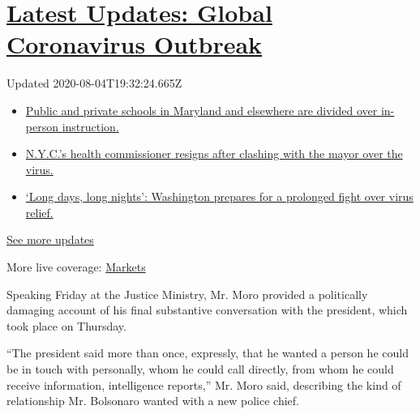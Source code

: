 \hypertarget{latest-updates-global-coronavirus-outbreak}{%
\section{\texorpdfstring{\href{https://www.nytimes3xbfgragh.onion/2020/08/04/world/coronavirus-cases.html?action=click\&pgtype=Article\&state=default\&region=MAIN_CONTENT_1\&context=storylines_live_updates}{Latest
Updates: Global Coronavirus
Outbreak}}{Latest Updates: Global Coronavirus Outbreak}}\label{latest-updates-global-coronavirus-outbreak}}

Updated 2020-08-04T19:32:24.665Z

\begin{itemize}
\tightlist
\item
  \href{https://www.nytimes3xbfgragh.onion/2020/08/04/world/coronavirus-cases.html?action=click\&pgtype=Article\&state=default\&region=MAIN_CONTENT_1\&context=storylines_live_updates\#link-4825b93}{Public
  and private schools in Maryland and elsewhere are divided over
  in-person instruction.}
\item
  \href{https://www.nytimes3xbfgragh.onion/2020/08/04/world/coronavirus-cases.html?action=click\&pgtype=Article\&state=default\&region=MAIN_CONTENT_1\&context=storylines_live_updates\#link-4d1eafa8}{N.Y.C.'s
  health commissioner resigns after clashing with the mayor over the
  virus.}
\item
  \href{https://www.nytimes3xbfgragh.onion/2020/08/04/world/coronavirus-cases.html?action=click\&pgtype=Article\&state=default\&region=MAIN_CONTENT_1\&context=storylines_live_updates\#link-6b644638}{`Long
  days, long nights': Washington prepares for a prolonged fight over
  virus relief.}
\end{itemize}

\href{https://www.nytimes3xbfgragh.onion/2020/08/04/world/coronavirus-cases.html?action=click\&pgtype=Article\&state=default\&region=MAIN_CONTENT_1\&context=storylines_live_updates}{See
more updates}

More live coverage:
\href{https://www.nytimes3xbfgragh.onion/live/2020/08/04/business/stock-market-today-coronavirus?action=click\&pgtype=Article\&state=default\&region=MAIN_CONTENT_1\&context=storylines_live_updates}{Markets}

Speaking Friday at the Justice Ministry, Mr. Moro provided a politically
damaging account of his final substantive conversation with the
president, which took place on Thursday.

``The president said more than once, expressly, that he wanted a person
he could be in touch with personally, whom he could call directly, from
whom he could receive information, intelligence reports,'' Mr. Moro
said, describing the kind of relationship Mr. Bolsonaro wanted with a
new police chief.

